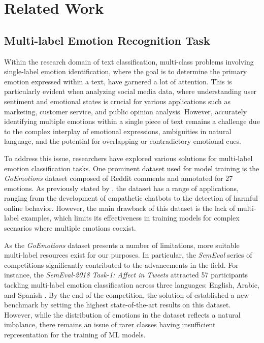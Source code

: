 \documentclass[manuscript]{clv3}
\begin{document}
\section{Related Work}
\subsection{Multi-label Emotion Recognition Task}
Within the research domain of text classification, multi-class problems involving single-label emotion identification, where the goal is to determine the primary emotion expressed within a text, have garnered a lot of attention. This is particularly evident when analyzing social media data, where understanding user sentiment and emotional states is crucial for various applications such as marketing, customer service, and public opinion analysis. However, accurately identifying multiple emotions within a single piece of text remains a challenge due to the complex interplay of emotional expressions, ambiguities in natural language, and the potential for overlapping or contradictory emotional cues. 

To address this issue, researchers have explored various solutions for multi-label emotion classification tasks. One prominent dataset used for model training is the \textit{GoEmotions} \cite{demszky-etal-2020-goemotions} dataset composed of Reddit comments and annotated for 27 emotions. As previously stated by \citet{demszky-etal-2020-goemotions}, the dataset has a range of applications, ranging from the development of empathetic chatbots to the detection of harmful online behavior. However, the main drawback of this dataset is the lack of multi-label examples, which limits its effectiveness in training models for complex scenarios where multiple emotions coexist.

As the \textit{GoEmotions} dataset presents a number of limitations, more suitable multi-label resources exist for our purposes. In particular, the \textit{SemEval} series of competitions significantly contributed to the advancements in the field. For instance, the \textit{SemEval-2018 Task-1: Affect in Tweets} attracted 57 participants tackling multi-label emotion classification across three languages: English, Arabic, and Spanish \cite{10.1016/j.eswa.2022.118534}. By the end of the competition, the solution of \citet{baziotis2018ntuaslp} established a new benchmark by setting the highest state-of-the-art results on this dataset. However, while the distribution of emotions in the dataset reflects a natural imbalance, there remains an issue of rarer classes having insufficient representation for the training of ML models.
\end{document}
